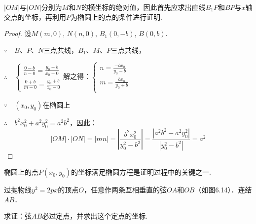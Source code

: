 \begin{figure}[htp]
    \centering
{}
    \caption{}
\end{figure}

\begin{analyze}
    $|OM|$与$|ON|$分别为$M$和$N$的横坐标的绝对值，因此首先应求出直线$B_1P$和$BP$与$x$轴交点的坐标，再利用$P$为椭圆上的点的条件进行证明.
\end{analyze}

\begin{proof}
    设$M(m,0)$, $N(n,0)$, $B_1(0,-b)$, $B(0,b)$.

$\because\quad     B$、$P$、$N$三点共线，$B_1$、$M$、$P$三点共线，

$\therefore\quad \begin{cases}
    \frac{0-b}{n-0}=\frac{y_0-b}{x_0-0}\\[1.5ex]
    \frac{0+b}{m-0}=\frac{y_0+b}{x_0-0}
\end{cases}$解之得：$\begin{cases}
    n=\frac{-bx_0}{y_0-b}\\[1.5ex]
    m=\frac{bx_0}{y_0+b}\\
\end{cases}$

$\because\quad (x_0,y_0)$在椭圆上 

$\therefore\quad b^2x^2_0+a^2y^2_0=a^2b^2$，因此：
\[|OM|\cdot |ON|=|mn|=\left|\frac{b^2x^2_0}{y^2_0-b^2}\right|=\frac{|a^2b^2-a^2y^2_0|}{|y^2_0-b^2|}=a^2\]
\end{proof}

\begin{remark}
椭圆上的点$P(x_0,y_0)$的坐标满足椭圆方程是证明过程中的关键之一.
\end{remark}

\begin{example}
过抛物线$y^2=2px$的顶点$O$，任意作两条互相垂直的弦$OA$和$OB$（如图6.14）．连结$AB$．

求证：弦$AB$必过定点，并求出这个定点的坐标.
\end{example}


